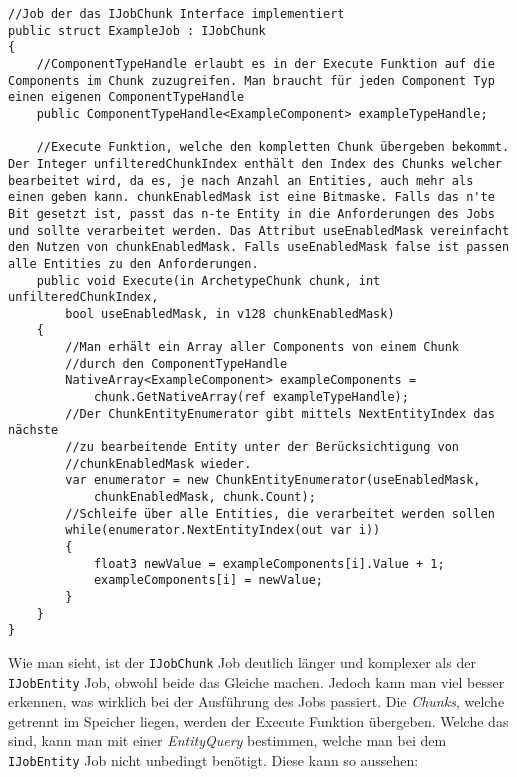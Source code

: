 \begin{lstlisting}[style=code, caption={[Beispiel für einen Job mit einem \textit{Chunk} für eine einfache Addition]Beispiel für einen Job mit einem \textit{Chunk} für eine einfache Addition. Dieser ist analog zu dem Beispiel für ein Job mit einem \textit{Entity}.}, label=IJobChunk]
//Job der das IJobChunk Interface implementiert
public struct ExampleJob : IJobChunk
{
    //ComponentTypeHandle erlaubt es in der Execute Funktion auf die Components im Chunk zuzugreifen. Man braucht für jeden Component Typ einen eigenen ComponentTypeHandle
    public ComponentTypeHandle<ExampleComponent> exampleTypeHandle;

    //Execute Funktion, welche den kompletten Chunk übergeben bekommt. Der Integer unfilteredChunkIndex enthält den Index des Chunks welcher bearbeitet wird, da es, je nach Anzahl an Entities, auch mehr als einen geben kann. chunkEnabledMask ist eine Bitmaske. Falls das n'te Bit gesetzt ist, passt das n-te Entity in die Anforderungen des Jobs und sollte verarbeitet werden. Das Attribut useEnabledMask vereinfacht den Nutzen von chunkEnabledMask. Falls useEnabledMask false ist passen alle Entities zu den Anforderungen.
    public void Execute(in ArchetypeChunk chunk, int unfilteredChunkIndex,
        bool useEnabledMask, in v128 chunkEnabledMask)
    {
        //Man erhält ein Array aller Components von einem Chunk
        //durch den ComponentTypeHandle
        NativeArray<ExampleComponent> exampleComponents =
            chunk.GetNativeArray(ref exampleTypeHandle);
        //Der ChunkEntityEnumerator gibt mittels NextEntityIndex das nächste
        //zu bearbeitende Entity unter der Berücksichtigung von
        //chunkEnabledMask wieder.
        var enumerator = new ChunkEntityEnumerator(useEnabledMask,
            chunkEnabledMask, chunk.Count);
        //Schleife über alle Entities, die verarbeitet werden sollen
        while(enumerator.NextEntityIndex(out var i))
        {
            float3 newValue = exampleComponents[i].Value + 1;
            exampleComponents[i] = newValue;
        }
    }
}
\end{lstlisting}
Wie man sieht, ist der \texttt{IJobChunk} Job deutlich länger und komplexer als der \texttt{IJobEntity} Job, obwohl beide das Gleiche machen. Jedoch kann man viel besser erkennen, was wirklich bei der Ausführung des Jobs passiert. Die \textit{Chunks}, welche getrennt im Speicher liegen, werden der Execute Funktion übergeben. Welche das sind, kann man mit einer \textit{EntityQuery} bestimmen, welche man bei dem \texttt{IJobEntity} Job nicht unbedingt benötigt. Diese kann so aussehen:
